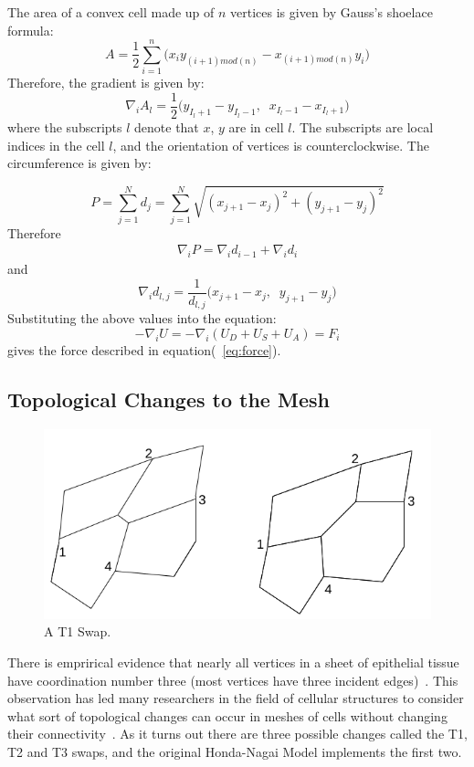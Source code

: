  The area of a convex cell made up of $n$ vertices is given by Gauss's shoelace formula:
\begin{equation}
A = \frac12\sum\limits_{i=1}^n\Big(x_iy_{(i+1)mod(n)}-x_{(i+1)mod(n)}y_i\Big)
\end{equation}
Therefore, the gradient is given by:
\begin{equation}
\nabla_i A_l = \frac12
\Big(
y_{I_l+1} - y_{I_l-1},\;\;x_{I_l-1} - x_{I_l+1}
\Big)
\end{equation}
 where the subscripts $l$ denote that $x$, $y$ are in cell $l$. The subscripts are local indices in the cell $l$, and the orientation of vertices is counterclockwise. The circumference is given by:

\begin{equation}
P = \sum\limits_{j=1}^Nd_j = \sum\limits_{j=1}^N\sqrt{(x_{j+1} - x_j)^2 + (y_{j+1} - y_j)^2}
\end{equation}
Therefore
\begin{gather}
\nabla_iP = \nabla_id_{i-1} + \nabla_id_i
\end{gather}
and
\begin{equation}
\nabla_id_{l, j} = \frac1{d_{l, j}}
\Big(
x_{j+1}- x_j,\;\; y_{j+1} - y_j
\Big)
\end{equation}
Substituting the above values into the equation:
\begin{equation}
-\nabla_iU = -\nabla_i(U_D + U_S + U_A) = F_i
\end{equation}
gives the force described in equation(~\ref{eq:force}).

\subsection{Topological Changes to the Mesh}
\begin{figure}
    \centering
    \includegraphics[width=\textwidth, keepaspectratio]{../diagrams/t1.png}
    \caption{A T1 Swap.}
    \label{fig:t1}
\end{figure}
There is emprirical evidence that nearly all vertices in a sheet of epithelial tissue have coordination number three (most vertices have three incident edges)~\cite{EpithelialTopology}. This observation has led many researchers in the field of cellular structures to consider what sort of topological changes can occur in meshes of cells without changing their connectivity~\cite{Soap}.  As it turns out there are three possible changes called the T1, T2 and T3 swaps, and the original Honda-Nagai Model implements the first two.

